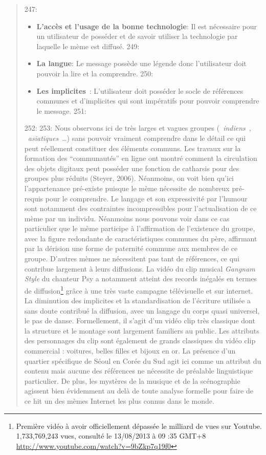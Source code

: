 \begin{quote}
247: \begin{itemize}
248:     \item \textbf{L’accès et l’usage de la bonne technologie}: Il est nécessaire pour un utilisateur de posséder et de savoir utiliser la technologie par laquelle le mème est diffusé.
249:     \item \textbf{La langue}: Le message possède une légende donc l’utilisateur doit pouvoir la lire et la comprendre.
250:     \item \textbf{Les implicites} : L’utilisateur doit posséder le socle de références communes et d’implicites qui sont impératifs pour pouvoir comprendre le message. 
251: \end{itemize}
252: 
253: Nous observons ici de tr\`es larges et vagues groupes ({\guillemotleft}~\textit{indiens}~{\guillemotright}, {\guillemotleft}~\textit{asiatiques}~{\guillemotright}{\dots}) sans pouvoir vraiment comprendre dans le d\'etail ce qui peut r\'eellement constituer des \'el\'ements communs. Les travaux sur la formation des {\textquotedblleft}communaut\'es{\textquotedblright} en ligne ont montr\'e comment la circulation des objets digitaux peut poss\'eder une fonction de catharsis pour des groupes plus r\'eduits (Steyer, 2006). N\'eanmoins, on voit bien qu{\textquoteright}ici l{\textquoteright}appartenance pr\'e-existe puisque le m\`eme n\'ecessite de nombreux pr\'e-requis pour le comprendre. Le langage et son expressivit\'e par l{\textquoteright}humour sont notamment des contraintes incompressibles pour l{\textquoteright}actualisation de ce m\`eme par un individu. N\'eanmoins nous pouvons voir dans ce cas particulier que le m\`eme participe \`a l{\textquoteright}affirmation de l{\textquoteright}existence du groupe, avec la figure redondante de caract\'eristiques communes du p\`ere, affirmant par la d\'erision une forme de paternit\'e commune aux membres de ce groupe. D{\textquoteright}autres m\`emes ne n\'ecessitent pas tant de r\'ef\'erences, ce qui contribue largement \`a leurs diffusions. La vid\'eo du clip musical \textit{Gangnam Style} du chanteur Psy a notamment atteint des records in\'egal\'es en termes de diffusion\footnote{ Premi\`ere vid\'eo \`a avoir officiellement d\'epass\'ee le milliard de vues sur Youtube. 1,733,769,243 vues, consult\'e le 13/08/2013 \`a 09 :35 GMT+8 \url{http://www.youtube.com/watch?v=9bZkp7q19f0}} gr\^ace \`a une tr\`es vaste campagne t\'el\'evisuelle et sur internet. La diminution des implicites et la standardisation de l{\textquoteright}\'ecriture utilis\'ee a sans doute contribu\'e la diffusion, avec un langage du corps quasi universel, le pas de danse. Formellement, il s{\textquoteright}agit d{\textquoteright}un vid\'eo clip tr\`es classique dont la structure et le montage sont largement familiers au public. Les attributs des personnages du clip sont \'egalement de grands classiques du vid\'eo clip commercial : voitures, belles filles et bijoux en or. La pr\'esence d{\textquoteright}un quartier sp\'ecifique de S\'eoul en Cor\'ee du Sud agit ici comme un attribut du contenu mais aucune des r\'ef\'erences ne n\'ecessite de pr\'ealable linguistique particulier. De plus, les myst\`eres de la musique et de la sc\'enographie agissent bien \'evidemment au del\`a de toute analyse formelle pour faire de ce hit un des m\`emes Internet les plus connus dans le monde. 

\end{quote}
